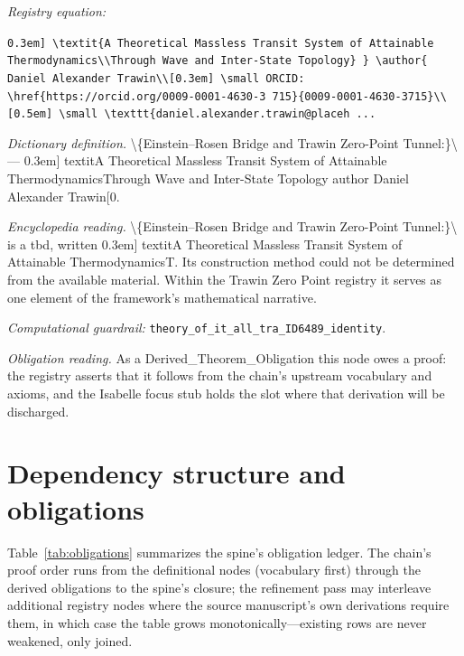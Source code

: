 \documentclass[11pt]{article}
\theoremstyle{remark}
\begin{document}
\noindent\textit{Registry equation:}\par
{\small\texttt{0.3em] \textbackslash{}textit\{A Theoretical Massless Transit System of Attainable Thermodynamics\textbackslash{}\textbackslash{}Through Wave and Inter-State Topology\} \} \textbackslash{}author\{ Daniel Alexander Trawin\textbackslash{}\textbackslash{}[0.3em] \textbackslash{}small ORCID: \textbackslash{}href\{https://orcid.org/0009-0001-4630-3 715\}\{0009-0001-4630-3715\}\textbackslash{}\textbackslash{}[0.5em] \textbackslash{}small \textbackslash{}texttt\{daniel.alexander.trawin@placeh ...}}\par\medskip
\noindent\textit{Dictionary definition.} \textbackslash{}\{Einstein--Rosen Bridge and Trawin Zero-Point Tunnel:\}\textbackslash{} --- 0.3em] textitA Theoretical Massless Transit System of Attainable ThermodynamicsThrough Wave and Inter-State Topology author Daniel Alexander Trawin[0.\par\medskip
\noindent\textit{Encyclopedia reading.} \textbackslash{}\{Einstein--Rosen Bridge and Trawin Zero-Point Tunnel:\}\textbackslash{} is a tbd, written 0.3em] textitA Theoretical Massless Transit System of Attainable ThermodynamicsT. Its construction method could not be determined from the available material. Within the Trawin Zero Point registry it serves as one element of the framework's mathematical narrative.
\par\medskip\noindent\textit{Computational guardrail:} \texttt{theory\_of\_it\_all\_tra\_ID6489\_identity}.
\par\medskip\noindent\textit{Obligation reading.} As a Derived\_Theorem\_Obligation this node owes a proof: the registry asserts that it follows from the chain's upstream vocabulary and axioms, and the Isabelle focus stub holds the slot where that derivation will be discharged.

\section{Dependency structure and obligations}
\label{sec:dep}

Table~\ref{tab:obligations} summarizes the spine's obligation ledger. The chain's proof order runs from the definitional nodes (vocabulary first) through the derived obligations to the spine's closure; the refinement pass may interleave additional registry nodes where the source manuscript's own derivations require them, in which case the table grows monotonically---existing rows are never weakened, only joined.
\end{document}
